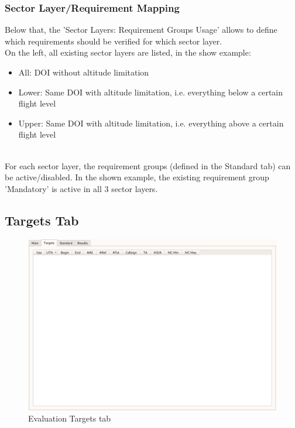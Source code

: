 \subsubsection{Sector Layer/Requirement Mapping}

Below that, the 'Sector Layers: Requirement Groups Usage' allows to define which requirements should be verified for which sector layer. \\

On the left, all existing sector layers are listed, in the show example:
\begin{itemize}  
\item All: DOI without altitude limitation
\item Lower: Same DOI with altitude limitation, i.e. everything below a certain flight level
\item Upper: Same DOI with altitude limitation, i.e. everything above a certain flight level
\end{itemize}
\ \\

For each sector layer, the requirement groups (defined in the Standard tab) can be active/disabled. In the shown example, the existing requirement group 'Mandatory' is active in all 3 sector layers.

\subsection{Targets Tab}

\begin{figure}[H]
  \hspace*{-2cm}
    \includegraphics[width=18cm,frame]{../screenshots/eval_targets_empty.png}
  \caption{Evaluation Targets tab}
\end{figure}

